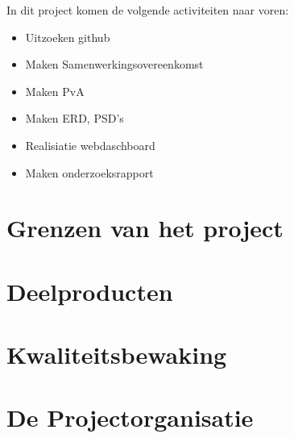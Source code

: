 \documentclass[11pt]{article}
\begin{document}
\begin{flushleft}
	
	In dit project komen de volgende activiteiten naar voren:
	
	
	\begin{itemize}
		
		\item Uitzoeken github
		\item Maken Samenwerkingsovereenkomst
		\item Maken PvA
		\item Maken ERD, PSD's
		\item Realisiatie webdaschboard
		\item Maken onderzoeksrapport
	\end{itemize}
	
\end{flushleft}

	
	

\newpage
\section[Grenzen] {Grenzen van het project}


\newpage
\section{Deelproducten}
\newpage
\section{Kwaliteitsbewaking}
\newpage
\section{De Projectorganisatie}
\newpage
\end{document}
